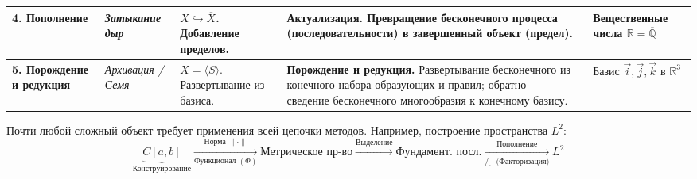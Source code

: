 \documentclass[11pt, a4paper]{extarticle}
\newcommand{\R}{{\mathbb R}}
\newcommand{\Q}{{\mathbb Q}}
\renewcommand{\bar}[1]{\overline{#1}}
\begin{document}
\begin{table}[h!]
\begin{minipage}{24cm}
\begin{tabular}{@{} p{3.5cm} p{3cm} p{5.5cm} p{7cm} p{3.5cm} @{}}
            \textbf{4. Пополнение} & 
            \textit{Затыкание дыр} & 
            $X \hookrightarrow \bar{X}$. \newline Добавление пределов. & 
            \textbf{Актуализация.} Превращение бесконечного процесса (последовательности) в завершенный объект (предел). & 
            Вещественные числа \newline $\R = \overline{\Q}$ \\ 
            \midrule
            
            \textbf{5. Порождение и редукция} & 
            \textit{Архивация / Семя} & 
            $X = \langle S \rangle$. \newline Развертывание из базиса. & 
            \textbf{Порождение и редукция.} Развертывание бесконечного из конечного набора образующих и правил; обратно — сведение бесконечного многообразия к конечному базису. & 
            Базис $\vec{i}, \vec{j}, \vec{k}$ в $\R^3$ \\ 
            \bottomrule
        \end{tabular}
        
        \vspace{0.5cm} 
        
        \begin{remark}
            Почти любой сложный объект требует применения всей цепочки методов. 
            Например, построение пространства $L^2$:
            $$ 
            \underbrace{C[a,b]}_{\text{Конструирование}} 
            \xrightarrow[\text{Функционал } (\Phi)]{\text{Норма } \|\cdot\|} 
            \text{Метрическое пр-во} 
            \xrightarrow{\text{Выделение}} 
            \text{Фундамент. посл.} 
            \xrightarrow[\text{{$/_\sim$} (Факторизация)}]{\text{Пополнение}} 
            L^2 
            $$
        \end{remark}
    \end{minipage}
\end{table}
\end{document}
